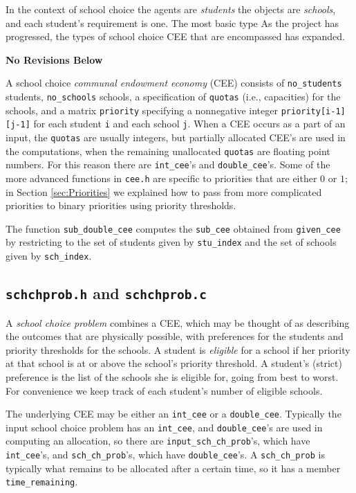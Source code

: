 \documentclass[12pt]{article}
\theoremstyle{definition}
\newcommand{\norev}{\medskip \centerline{\textbf{No Revisions Below}} \medskip}
\begin{document}
\begin{appendix}
In the context of school choice the agents are \emph{students} the
objects are \emph{schools}, and each student's requirement is one.
The most basic type 
As the project has progressed, the types of school choice CEE that are encompassed has expanded.  

\norev

A school choice \emph{communal endowment economy} (CEE) consists of
\texttt{no\_students} students, \texttt{no\_schools} schools, a
specification of \texttt{quotas} (i.e., capacities) for the schools,
and a matrix \texttt{priority} specifying a nonnegative integer
\texttt{priority[i-1][j-1]} for each student \texttt{i} and each
school \texttt{j}.  When a CEE occurs as a part of an input, the
\texttt{quotas} are usually integers, but partially allocated CEE's
are used in the computations, when the remaining unallocated
\texttt{quotas} are floating point numbers.  For this reason there are
\texttt{int\_cee}'s and \texttt{double\_cee}'s.  Some of the more
advanced functions in \texttt{cee.h} are specific to priorities that
are either $0$ or $1$; in Section \ref{sec:Priorities} we explained
how to pass from more complicated priorities to binary priorities
using priority thresholds.

The function
\texttt{sub\_double\_cee} computes the \texttt{sub\_cee} obtained from
\texttt{given\_cee} by restricting to the set of students given by
\texttt{stu\_index} and the set of schools given by
\texttt{sch\_index}.

\subsection{\texttt{schchprob.h} and \texttt{schchprob.c}}

A \emph{school choice problem} combines a CEE, which may be thought of
as describing the outcomes that are physically possible, with
preferences for the students and priority thresholds for the schools.
A student is \emph{eligible} for a school if her priority at that
school is at or above the school's priority threshold. A student's
(strict) preference is the list of the schools she is eligible for,
going from best to worst.  For convenience we keep track of each
student's number of eligible schools.

The underlying CEE may be either an \texttt{int\_cee} or a
\texttt{double\_cee}.  Typically the input school choice problem has
an \texttt{int\_cee}, and \texttt{double\_cee}'s are used in computing
an allocation, so there are \texttt{input\_sch\_ch\_prob}'s, which
have \texttt{int\_cee}'s, and \texttt{sch\_ch\_prob}'s, which have
\texttt{double\_cee}'s.  A \texttt{sch\_ch\_prob} is typically what
remains to be allocated after a certain time, so it has a member
\texttt{time\_remaining}.


\end{appendix}
\end{document}
